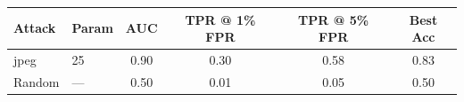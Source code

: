 \begin{tabular}{llcccc}
\toprule
Attack & Param & AUC & TPR @ 1\% FPR & TPR @ 5\% FPR & Best Acc \\
\midrule
jpeg & 25 & 0.90 & 0.30 & 0.58 & 0.83 \\
Random & — & 0.50 & 0.01 & 0.05 & 0.50 \\
\bottomrule
\end{tabular}
